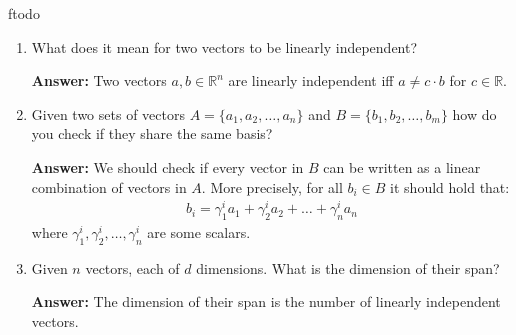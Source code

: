 ƒtodo\documentclass{article}
\newenvironment{QandA}{\begin{enumerate}[label=\arabic*.]}{\end{enumerate}}
\newenvironment{answer}{\par\normalfont \textbf{Answer:}}{}
\newcommand{\R}{\mathbb{R}}
\begin{document}
\begin{QandA}
    \item What does it mean for two vectors to be linearly independent?
    \begin{answer}
        Two vectors $a, b \in \R^n$ are linearly independent iff $a \neq c \cdot b$ for $c \in \R$.
    \end{answer}
    
    \item Given two sets of vectors $A = \{ a_1, a_2, \ldots, a_n\}$ and $B = \{b_1, b_2, \ldots, b_m\}$ how do you check if they share the same basis?
    \begin{answer}
         We should check if every vector in $B$ can be written as a linear combination of vectors in $A$. More precisely, for all $b_i \in B$ it should hold that:
         \begin{align*}
             b_i = \gamma_1^i a_1 + \gamma_2^i a_2 + \ldots + \gamma_n^i a_n
         \end{align*}
         where $\gamma_1^i, \gamma_2^i, \ldots, \gamma_n^i$ are some scalars.
    \end{answer}
    
    \item Given $n$ vectors, each of $d$ dimensions. What is the dimension of their span?
    \begin{answer}
        The dimension of their span is the number of linearly independent vectors. 
    \end{answer}


\end{QandA}
\end{document}
